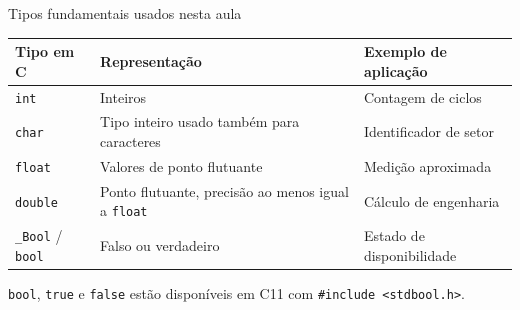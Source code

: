 \begin{frame}{Tipos fundamentais usados nesta aula}
\small
\begin{tabularx}{\textwidth}{lXX}
\toprule
Tipo em C & Representação & Exemplo de aplicação \\
\midrule
\texttt{int} & Inteiros & Contagem de ciclos \\
\texttt{char} & Tipo inteiro usado também para caracteres & Identificador de setor \\
\texttt{float} & Valores de ponto flutuante & Medição aproximada \\
\texttt{double} & Ponto flutuante, precisão ao menos igual a \texttt{float} & Cálculo de engenharia \\
\texttt{\_Bool} / \texttt{bool} & Falso ou verdadeiro & Estado de disponibilidade \\
\bottomrule
\end{tabularx}
\medskip
\texttt{bool}, \texttt{true} e \texttt{false} estão disponíveis em C11 com \texttt{\#include <stdbool.h>}.
\end{frame}
